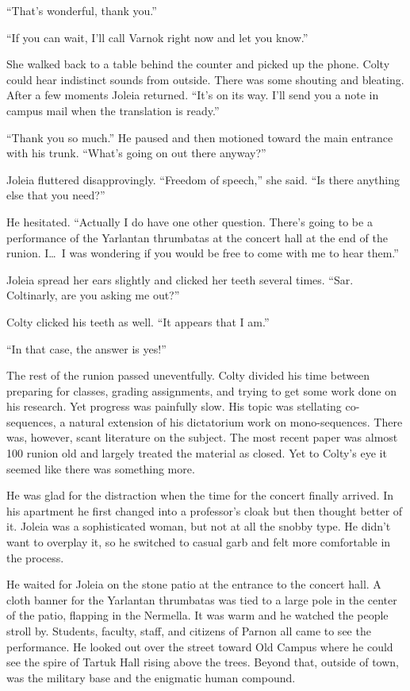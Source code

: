 ``That's wonderful, thank you.''

``If you can wait, I'll call Varnok right now and let you know.''

She walked back to a table behind the counter and picked up the phone. Colty could hear
indistinct sounds from outside. There was some shouting and bleating. After a few moments Joleia
returned. ``It's on its way. I'll send you a note in campus mail when the translation is
ready.''

``Thank you so much.'' He paused and then motioned toward the main entrance with his trunk.
``What's going on out there anyway?''

Joleia fluttered disapprovingly. ``Freedom of speech,'' she said. ``Is there anything else that
you need?''

He hesitated. ``Actually I do have one other question. There's going to be a performance of the
Yarlantan thrumbatas at the concert hall at the end of the runion. I\ldots\ I was wondering if
you would be free to come with me to hear them.''

Joleia spread her ears slightly and clicked her teeth several times. ``Sar. Coltinarly, are you
asking me out?''

Colty clicked his teeth as well. ``It appears that I am.''

``In that case, the answer is yes!''

\spacebreak

The rest of the runion passed uneventfully. Colty divided his time between preparing for
classes, grading assignments, and trying to get some work done on his research. Yet progress was
painfully slow. His topic was stellating co-sequences, a natural extension of his dictatorium
work on mono-sequences. There was, however, scant literature on the subject. The most recent
paper was almost 100 runion old and largely treated the material as closed. Yet to Colty's eye
it seemed like there was something more.

He was glad for the distraction when the time for the concert finally arrived. In his apartment
he first changed into a professor's cloak but then thought better of it. Joleia was a
sophisticated woman, but not at all the snobby type. He didn't want to overplay it, so he
switched to casual garb and felt more comfortable in the process.

He waited for Joleia on the stone patio at the entrance to the concert hall. A cloth banner for
the Yarlantan thrumbatas was tied to a large pole in the center of the patio, flapping in the
Nermella. It was warm and he watched the people stroll by. Students, faculty, staff, and
citizens of Parnon all came to see the performance. He looked out over the street toward Old
Campus where he could see the spire of Tartuk Hall rising above the trees. Beyond that, outside
of town, was the military base and the enigmatic human compound.

